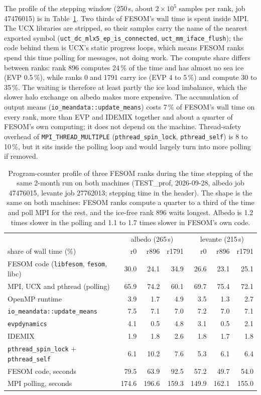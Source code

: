 \documentclass[11pt,a4paper]{article}
\begin{document}
The profile of the stepping window (250\,s, about $2\times10^5$ samples per rank, job 47476015) is in Table~\ref{tab:prof}. Two thirds of FESOM's wall time is spent inside MPI. The UCX libraries are stripped, so their samples carry the name of the nearest exported symbol (\texttt{uct\_dc\_mlx5\_ep\_is\_connected}, \texttt{uct\_mm\_iface\_flush}); the code behind them is UCX's static progress loops, which means FESOM ranks spend this time polling for messages, not doing work. The compute share differs between ranks: rank 896 computes 24\,\% of the time and has almost no sea ice (EVP 0.5\,\%), while ranks 0 and 1791 carry ice (EVP 4 to 5\,\%) and compute 30 to 35\,\%. The waiting is therefore at least partly the ice load imbalance, which the slower halo exchange on albedo makes more expensive. The accumulation of output means (\texttt{io\_meandata::update\_means}) costs 7\,\% of FESOM's wall time on every rank, more than EVP and IDEMIX together and about a quarter of FESOM's own computing; it does not depend on the machine. Thread-safety overhead of \texttt{MPI\_THREAD\_MULTIPLE} (\texttt{pthread\_spin\_lock}, \texttt{pthread\_self}) is 8 to 10\,\%, but it sits inside the polling loop and would largely turn into more polling if removed.
\begin{table}[H]\centering\small
\begin{tabular}{lrrr|rrr}
\hline
 & \multicolumn{3}{c|}{albedo (265\,s)} & \multicolumn{3}{c}{levante (215\,s)}\\
share of wall time (\%) & r0 & r896 & r1791 & r0 & r896 & r1791\\
\hline
FESOM code (\texttt{libfesom}, \texttt{fesom}, libc) & 30.0 & 24.1 & 34.9 & 26.6 & 23.1 & 25.1\\
MPI, UCX and pthread (polling) & 65.9 & 74.2 & 60.1 & 69.7 & 75.4 & 72.1\\
OpenMP runtime & 3.9 & 1.7 & 4.9 & 3.5 & 1.3 & 2.7\\
\hline
\texttt{io\_meandata::update\_means} & 7.5 & 7.1 & 7.0 & 7.2 & 7.0 & 7.1\\
\texttt{evpdynamics} & 4.1 & 0.5 & 4.8 & 3.1 & 0.5 & 2.1\\
IDEMIX & 1.9 & 1.8 & 2.6 & 1.8 & 1.7 & 1.8\\
\texttt{pthread\_spin\_lock} + \texttt{pthread\_self} & 6.1 & 10.2 & 7.6 & 5.3 & 6.1 & 6.4\\
\hline
FESOM code, seconds & 79.5 & 63.9 & 92.5 & 57.2 & 49.7 & 54.0\\
MPI polling, seconds & 174.6 & 196.6 & 159.3 & 149.9 & 162.1 & 155.0\\
\hline
\end{tabular}
\caption{Program-counter profile of three FESOM ranks during the time stepping of the same 2-month run on both machines (TEST\_prof, 2026-09-28, albedo job 47476015, levante job 27762013; stepping time in the header). The shape is the same on both machines: FESOM ranks compute a quarter to a third of the time and poll MPI for the rest, and the ice-free rank 896 waits longest. Albedo is 1.2 times slower in the polling and 1.1 to 1.7 times slower in FESOM's own code.}\label{tab:prof}
\end{table}
\end{document}
